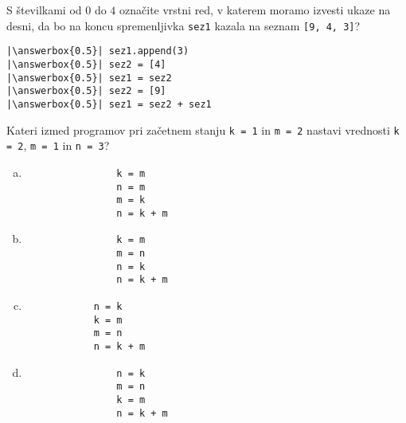 \documentclass[arhiv, 10pt]{../izpit}
\newcommand{\inlinepy}[1]{\texttt{#1}}
\newcommand{\answerbox}[1]{\framebox{\vphantom{\large M}\hspace{#1cm}}}
\begin{document}
        \naloga*
        \begin{multicols}{2}
        \noindent 
        S številkami od $0$ do $4$ označite vrstni red, v katerem moramo izvesti ukaze na desni, da bo na koncu spremenljivka \inlinepy{sez1} kazala na seznam \inlinepy{[9, 4, 3]}?
    
        \columnbreak
        \noindent
        \begin{verbatim}
|\answerbox{0.5}| sez1.append(3)
|\answerbox{0.5}| sez2 = [4]
|\answerbox{0.5}| sez1 = sez2
|\answerbox{0.5}| sez2 = [9]
|\answerbox{0.5}| sez1 = sez2 + sez1

        \end{verbatim}
        \end{multicols}
    
            
        \naloga*
        
        Kateri izmed programov pri začetnem stanju
            \inlinepy{k = 1} in
            \inlinepy{m = 2}
        nastavi vrednosti
            \inlinepy{k = 2},
            \inlinepy{m = 1} in
            \inlinepy{n = 3}?
    
        \begin{multicols}{4}
        \begin{enumerate}[(a)]
\item 
                \begin{verbatim}
                k = m
                n = m
                m = k
                n = k + m
                \end{verbatim}
            
\item 
                \begin{verbatim}
                k = m
                m = n
                n = k
                n = k + m
                \end{verbatim}
            
\item 
            \begin{verbatim}
            n = k
            k = m
            m = n
            n = k + m
            \end{verbatim}
        
\item 
                \begin{verbatim}
                n = k
                m = n
                k = m
                n = k + m
                \end{verbatim}
            
\end{enumerate}

        \end{multicols}
    
\end{document}
